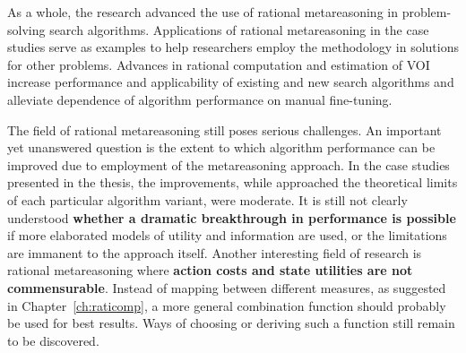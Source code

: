 As a whole, the research advanced the use of rational
metareasoning in problem-solving search algorithms. Applications of
rational metareasoning in the case studies serve as examples
to help researchers employ the methodology in solutions for other
problems. Advances in rational computation and estimation of VOI increase
performance and applicability of existing and new search algorithms
and alleviate dependence of algorithm performance on manual
fine-tuning.

The field of rational metareasoning still poses serious
challenges. An important yet unanswered question is the extent
to which algorithm performance can be improved due to employment of
the metareasoning approach. In the case studies presented in the thesis,
the improvements, while approached the theoretical limits of each
particular algorithm variant, were moderate. It is still not clearly
understood \textbf{whether a dramatic breakthrough in performance is possible}
if more elaborated models of utility and information are used, or the 
limitations are immanent to the approach itself. Another interesting
field of research is rational metareasoning where \textbf{action costs and
state utilities are not commensurable}. Instead of mapping between
different measures, as suggested in Chapter~\ref{ch:raticomp}, a
more general combination function should probably be used for best
results. Ways of choosing or deriving such a function still remain
to be discovered.
